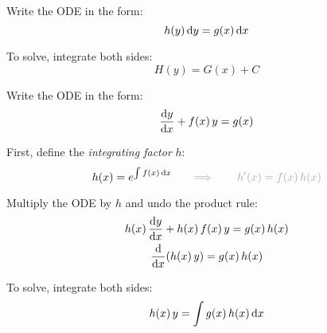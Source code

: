 \begin{multicols}{2}

    \begin{CheatsheetEntryFrame}


        Write the ODE in the form:
        \begin{equation*}
            h(y) \,\mathrm{d}{y} = g(x) \,\mathrm{d}{x}
        \end{equation*}

        To solve, integrate both sides:
        \begin{equation*}
            H(y) = G(x) + C
        \end{equation*}

    \end{CheatsheetEntryFrame}

    \begin{CheatsheetEntryFrame}


        Write the ODE in the form:
        \begin{equation*}
            \frac{\mathrm{d}{y}}{\mathrm{d}{x}} + f(x) \, y = g(x)
        \end{equation*}

        First, define the \textit{integrating factor} $h$:
        \begin{equation*}
            h(x) = e^{\int{f(x) \,\diff{x}}}
            \Exn{
                \qquad \Longrightarrow \qquad
                h'(x) = f(x) \, h(x)
            }
        \end{equation*}

        Multiply the ODE by $h$ and undo the product rule:
        \begin{gather*}
            h(x) \, \frac{\diff{y}}{\diff{x}} + h(x) \, f(x) \, y = g(x) \, h(x) \\
            \frac{\diff{}}{\diff{x}} \parens*{h(x) \, y} = g(x) \, h(x)
        \end{gather*}

        To solve, integrate both sides:
        \begin{equation*}
            h(x) \, y = \int{g(x) \, h(x) \,\ensuremath{\mathrm{d}}{x}}
        \end{equation*}

    \end{CheatsheetEntryFrame}

    \MulticolsBreak


\end{multicols}
